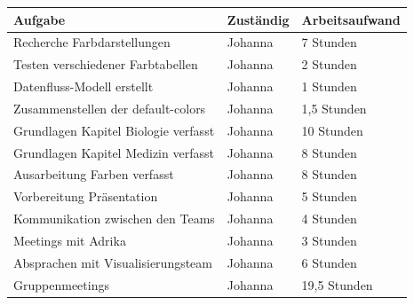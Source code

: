 \documentclass[12pt]{article}
\begin{document}
\begin{table}[H]
	\begin{tabular}{l|l|l}
		Aufgabe                       & Zuständig & Arbeitsaufwand \\ 
		\hline
		Recherche Farbdarstellungen             & Johanna   & 7 Stunden               \\
		Testen verschiedener Farbtabellen     & Johanna   & 2 Stunden               \\ 
		Datenfluss-Modell erstellt     	& Johanna   & 1 Stunden               \\
		Zusammenstellen der default-colors             & Johanna   & 1,5 Stunden      \\ 
		Grundlagen Kapitel Biologie verfasst              & Johanna   & 10 Stunden               \\ 
		Grundlagen Kapitel Medizin  verfasst              & Johanna   & 8 Stunden               \\ 
        Ausarbeitung Farben verfasst              & Johanna   & 8 Stunden               \\
		Vorbereitung Präsentation              & Johanna   & 5 Stunden               \\
		Kommunikation zwischen den Teams   & Johanna   & 4 Stunden      \\ 
        Meetings mit Adrika                & Johanna   & 3 Stunden    \\ 
        Absprachen mit Visualisierungsteam                & Johanna   & 6 Stunden    \\ 
        Gruppenmeetings                & Johanna   & 19,5 Stunden    \\ 
	\end{tabular}
\end{table}

\newpage

\printbibliography
\end{document}

